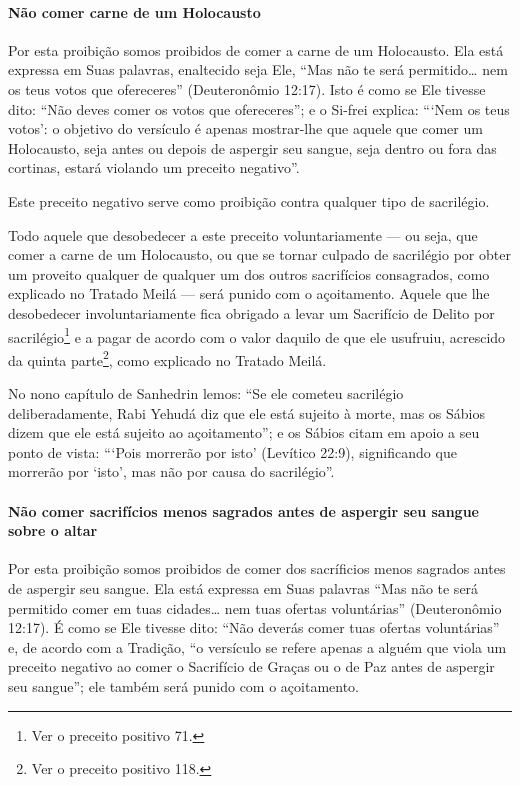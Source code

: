 \paragraph{Não comer carne de um Holocausto}

Por esta proibição somos proibidos de comer a carne de um Holocausto.
Ela está expressa em Suas palavras, enaltecido seja Ele, ``Mas não te
será permitido\ldots{} nem os teus votos que ofereceres'' (Deuteronômio
12:17). Isto é como se Ele tivesse dito: ``Não deves comer os votos que
ofereceres''; e o Si-frei explica: ```Nem os teus votos': o objetivo do
versículo é apenas mostrar-lhe que aquele que comer um Holocausto, seja
antes ou depois de aspergir seu sangue, seja dentro ou fora das
cortinas, estará violando um preceito negativo''.

Este preceito negativo serve como proibição contra qualquer tipo de
sacrilégio.

Todo aquele que desobedecer a este preceito voluntariamente --- ou seja,
que comer a carne de um Holocausto, ou que se tornar culpado de
sacrilégio por obter um proveito qualquer de qualquer um dos outros
sacrifícios consagrados, como explicado no Tratado Meilá --- será
punido com o açoitamento. Aquele que lhe desobedecer involuntariamente
fica obrigado a levar um Sacrifício de Delito por
sacrilégio\footnote{Ver o preceito positivo 71.} e a pagar de acordo com o valor daquilo
de que ele usufruiu, acrescido da quinta parte\footnote{Ver o preceito positivo 118.},
como explicado no Tratado Meilá.

No nono capítulo de Sanhedrin lemos: ``Se ele cometeu sacrilégio
deliberadamente, Rabi Yehudá diz que ele está sujeito à morte, mas os
Sábios dizem que ele está sujeito ao açoitamento''; e os Sábios citam em
apoio a seu ponto de vista: ```Pois morrerão por isto' (Levítico 22:9),
significando que morrerão por `isto', mas não por causa do
sacrilégio''.

\paragraph{Não comer sacrifícios menos sagrados antes de aspergir seu sangue sobre o altar}

Por esta proibição somos proibidos de comer dos sacríficios menos
sagrados antes de aspergir seu sangue. Ela está expressa em Suas
palavras ``Mas não te será permitido comer em tuas cidades\ldots{} nem tuas
ofertas voluntárias'' (Deuteronômio 12:17). É como se Ele tivesse dito:
``Não deverás comer tuas ofertas voluntárias'' e, de acordo com a
Tradição, ``o versículo se refere apenas
a alguém que viola um preceito negativo ao comer o Sacrifício de Graças
ou o de Paz antes de aspergir seu sangue''; ele também será punido com o
açoitamento.

